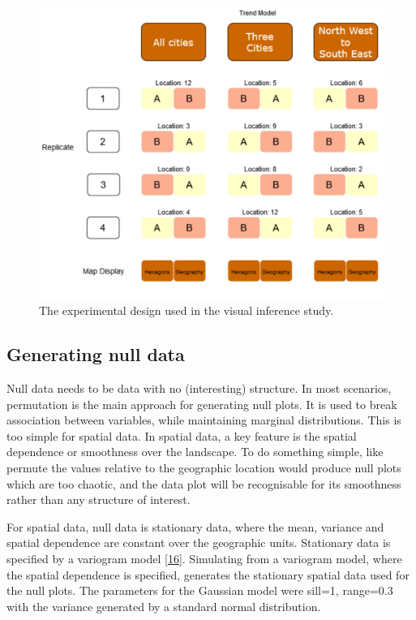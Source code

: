 \documentclass[conference,final,]{IEEEtran}
\begin{document}
\begin{figure}
\includegraphics[width=1\linewidth]{paper_files/figure-latex/exp-design-1} \caption{The experimental design used in the visual inference study.}\label{fig:exp-design}
\end{figure}

\hypertarget{generating-null-data}{%
\subsection{Generating null data}\label{generating-null-data}}

Null data needs to be data with no (interesting) structure. In most scenarios, permutation is the main approach for generating null plots. It is used to break association between variables, while maintaining marginal distributions. This is too simple for spatial data. In spatial data, a key feature is the spatial dependence or smoothness over the landscape. To do something simple, like permute the values relative to the geographic location would produce null plots which are too chaotic, and the data plot will be recognisable for its smoothness rather than any structure of interest.

For spatial data, null data is stationary data, where the mean, variance and spatial dependence are constant over the geographic units. Stationary data is specified by a variogram model {[}\protect\hyperlink{ref-POG}{16}{]}. Simulating from a variogram model, where the spatial dependence is specified, generates the stationary spatial data used for the null plots. The parameters for the Gaussian model were sill=1, range=0.3 with the variance generated by a standard normal distribution.
\end{document}

